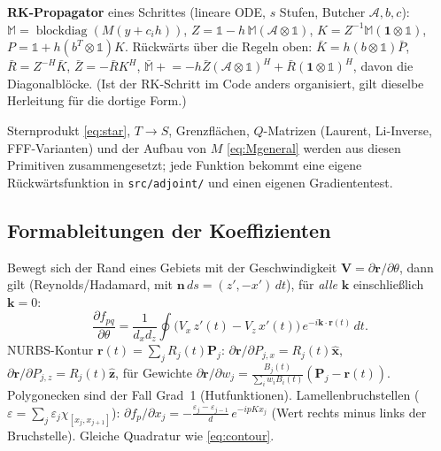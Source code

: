 \textbf{RK-Propagator} eines Schrittes (lineare ODE, $s$ Stufen, Butcher $\mathcal A,b,c$):
$\mathbb M=\operatorname{blockdiag}(M(y+c_ih))$, $Z=\mathbb 1-h\,\mathbb M(\mathcal A\otimes\mathbb 1)$,
$K=Z^{-1}\mathbb M(\mathbf 1\otimes\mathbb 1)$, $P=\mathbb 1+h(b^T\otimes\mathbb 1)K$. Rückwärts über die Regeln oben:
$\bar K=h(b\otimes\mathbb 1)\bar P$, $\bar R=Z^{-H}\bar K$, $\bar Z=-\bar RK^H$,
$\bar{\mathbb M}\mathrel{+}=-h\bar Z(\mathcal A\otimes\mathbb 1)^H+\bar R(\mathbf 1\otimes\mathbb 1)^H$, davon die Diagonalblöcke.
(Ist der RK-Schritt im Code anders organisiert, gilt dieselbe Herleitung für die dortige Form.)

Sternprodukt \eqref{eq:star}, $T\to S$, Grenzflächen, $Q$-Matrizen (Laurent, Li-Inverse, FFF-Varianten) und der Aufbau
von $M$ \eqref{eq:Mgeneral} werden aus diesen Primitiven zusammengesetzt; jede Funktion bekommt eine eigene
Rückwärtsfunktion in \verb|src/adjoint/| und einen eigenen Gradiententest.

\subsection{Formableitungen der Koeffizienten}\label{sec:adj_shape}
Bewegt sich der Rand eines Gebiets mit der Geschwindigkeit $\mathbf V=\partial\mathbf r/\partial\theta$, dann gilt
(Reynolds/Hadamard, mit $\mathbf n\,ds=(z',-x')\,dt$), für \emph{alle} $\mathbf k$ einschließlich $\mathbf k=0$:
\begin{equation}
  \frac{\partial f_{pq}}{\partial\theta}=\frac{1}{d_xd_z}\oint\big(V_x\,z'(t)-V_z\,x'(t)\big)\,e^{-i\mathbf k\cdot\mathbf r(t)}\,dt .
  \label{eq:shape2d}
\end{equation}
NURBS-Kontur $\mathbf r(t)=\sum_jR_j(t)\mathbf P_j$: $\partial\mathbf r/\partial P_{j,x}=R_j(t)\hat{\mathbf x}$,
$\partial\mathbf r/\partial P_{j,z}=R_j(t)\hat{\mathbf z}$, für Gewichte
$\partial\mathbf r/\partial w_j=\frac{B_j(t)}{\sum_iw_iB_i(t)}(\mathbf P_j-\mathbf r(t))$. Polygonecken sind der Fall Grad~1
(Hutfunktionen). Lamellenbruchstellen ($\varepsilon=\sum_j\varepsilon_j\chi_{[x_j,x_{j+1}]}$): $\partial f_p/\partial x_j=-\frac{\varepsilon_j-\varepsilon_{j-1}}{d}\,e^{-ipKx_j}$
(Wert rechts minus links der Bruchstelle). Gleiche Quadratur wie \eqref{eq:contour}.


